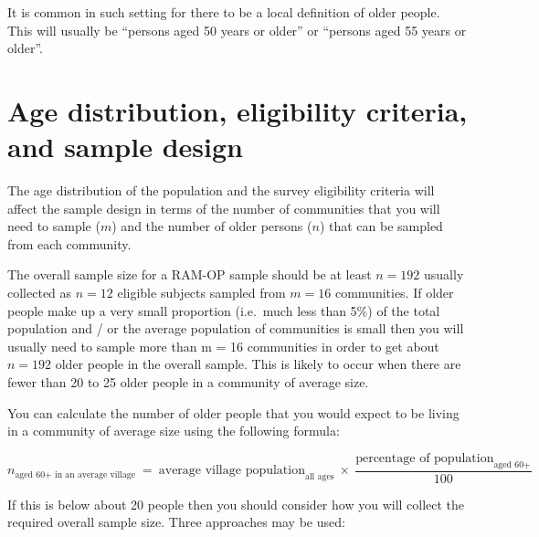 \documentclass[12pt,]{book}
\theoremstyle{definition}
\theoremstyle{definition}
\theoremstyle{definition}
\theoremstyle{remark}
\begin{document}
It is common in such setting for there to be a local definition of older
people. This will usually be ``persons aged 50 years or older'' or
``persons aged 55 years or older''.

\newpage

\hypertarget{age-distribution-eligibility-criteria-and-sample-design}{%
\section{Age distribution, eligibility criteria, and sample
design}\label{age-distribution-eligibility-criteria-and-sample-design}}

The age distribution of the population and the survey eligibility
criteria will affect the sample design in terms of the number of
communities that you will need to sample (\(m\)) and the number of older
persons (\(n\)) that can be sampled from each community.

The overall sample size for a RAM-OP sample should be at least
\(n = 192\) usually collected as \(n = 12\) eligible subjects sampled
from \(m = 16\) communities. If older people make up a very small
proportion (i.e.~much less than 5\%) of the total population and / or
the average population of communities is small then you will usually
need to sample more than m = 16 communities in order to get about
\(n = 192\) older people in the overall sample. This is likely to occur
when there are fewer than 20 to 25 older people in a community of
average size.

You can calculate the number of older people that you would expect to be
living in a community of average size using the following formula:

\[ n_{\text{aged 60+ in an average village}} ~ = ~ \text{average village population}_{\text{all ages}} ~ \times ~ \frac{\text{percentage of population}_{\text{aged 60+}}}{100} \]

If this is below about 20 people then you should consider how you will
collect the required overall sample size. Three approaches may be used:
\end{document}
